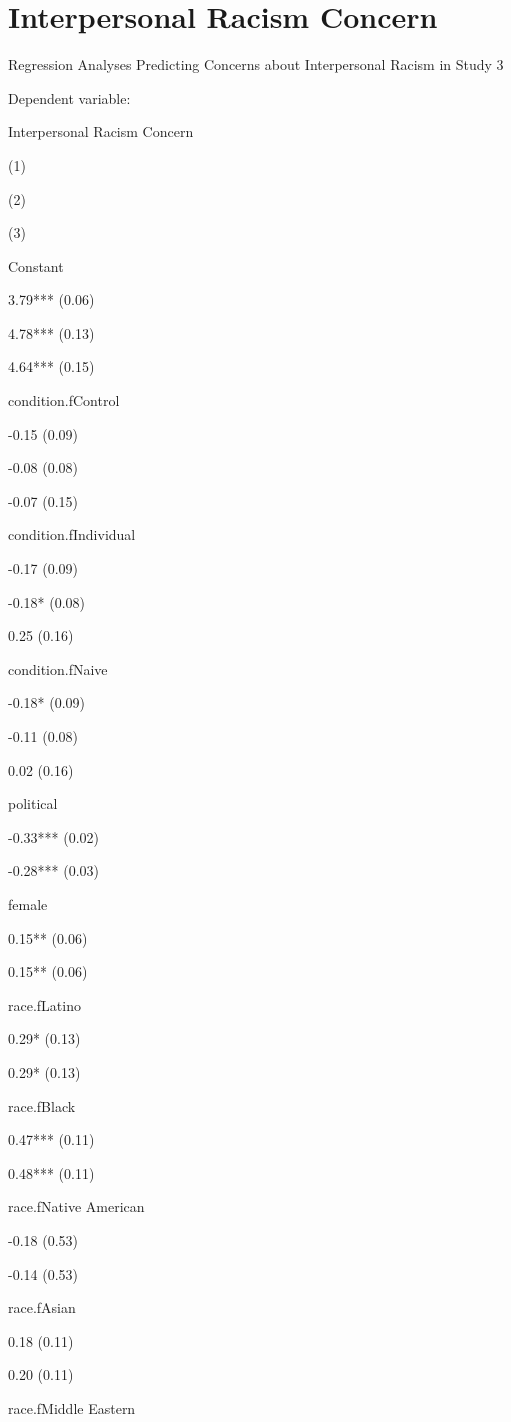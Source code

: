 \documentclass[
]{book}
\begin{document}
\hypertarget{interpersonal-racism-concern}{%
\section{Interpersonal Racism Concern}\label{interpersonal-racism-concern}}

Regression Analyses Predicting Concerns about Interpersonal Racism in Study 3

Dependent variable:

Interpersonal Racism Concern

(1)

(2)

(3)

Constant

3.79*** (0.06)

4.78*** (0.13)

4.64*** (0.15)

condition.fControl

-0.15 (0.09)

-0.08 (0.08)

-0.07 (0.15)

condition.fIndividual

-0.17 (0.09)

-0.18* (0.08)

0.25 (0.16)

condition.fNaive

-0.18* (0.09)

-0.11 (0.08)

0.02 (0.16)

political

-0.33*** (0.02)

-0.28*** (0.03)

female

0.15** (0.06)

0.15** (0.06)

race.fLatino

0.29* (0.13)

0.29* (0.13)

race.fBlack

0.47*** (0.11)

0.48*** (0.11)

race.fNative American

-0.18 (0.53)

-0.14 (0.53)

race.fAsian

0.18 (0.11)

0.20 (0.11)

race.fMiddle Eastern
\end{document}
